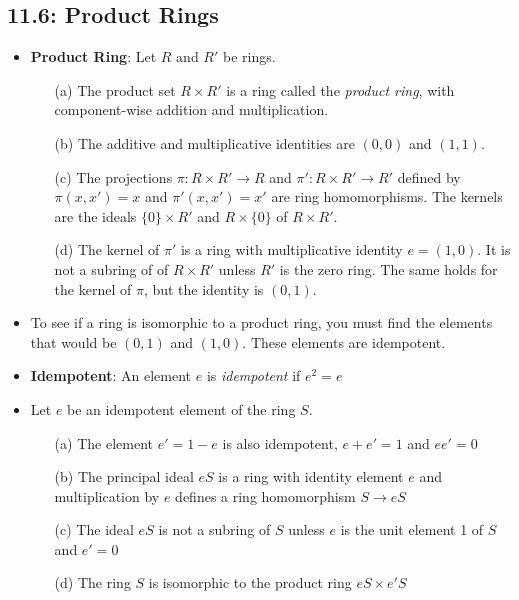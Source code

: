 \documentclass[12pt]{article}
\begin{document}
\subsection*{11.6: Product Rings}
\begin{itemize}
  \item \textbf{Product Ring}: Let $R$ and $R'$ be rings.
  \begin{enumerate}
    \item[(a)] The product set $R \times R'$ is a ring called the \textit{product ring}, with component-wise addition and multiplication.
    \item[(b)] The additive and multiplicative identities are $(0,0)$ and $(1,1)$.
    \item[(c)] The projections $\pi: R \times R' \to R$ and $\pi': R \times R' \to R'$ defined by $\pi(x,x') = x$ and $\pi'(x,x') = x'$ are ring homomorphisms. The kernels are the ideals $\{0\} \times R'$ and $R \times \{0\}$ of $R \times R'$.
    \item[(d)] The kernel of $\pi'$ is a ring with multiplicative identity $e = (1,0)$. It is not a subring of of $R \times R'$ unless $R'$ is the zero ring. The same holds for the kernel of $\pi$, but the identity is $(0,1)$.
  \end{enumerate}
  \item To see if a ring is isomorphic to a product ring, you must find the elements that would be $(0,1)$ and $(1,0)$. These elements are idempotent.
  \item \textbf{Idempotent}: An element $e$ is \textit{idempotent} if $e^2 = e$
  \item Let $e$ be an idempotent element of the ring $S$.
  \begin{enumerate}
    \item[(a)] The element $e' = 1 - e$ is also idempotent, $e + e' = 1$ and $ee' = 0$
    \item[(b)] The principal ideal $eS$ is a ring with identity element $e$ and multiplication by $e$ defines a ring homomorphism $S \to eS$
    \item[(c)] The ideal $eS$ is not a subring of $S$ unless $e$ is the unit element 1 of $S$ and $e' = 0$
    \item[(d)] The ring $S$ is isomorphic to the product ring $eS \times e'S$
  \end{enumerate}
\end{itemize}
\end{document}
